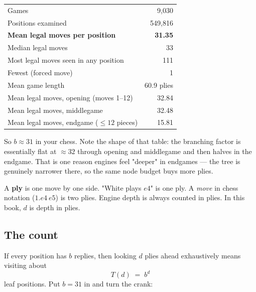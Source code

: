 \begin{realdata}[title={Real data: your corpus (\texttt{tools/corpus\_stats.py})}]
\begin{center}
\begin{tabular}{@{}lr@{}}
\toprule
Games & 9{,}030 \\
Positions examined & 549{,}816 \\
\textbf{Mean legal moves per position} & \textbf{31.35} \\
Median legal moves & 33 \\
Most legal moves seen in any position & 111 \\
Fewest (forced move) & 1 \\
Mean game length & 60.9 plies \\
\midrule
Mean legal moves, opening (moves 1--12) & 32.84 \\
Mean legal moves, middlegame & 32.48 \\
Mean legal moves, endgame ($\le 12$ pieces) & 15.81 \\
\bottomrule
\end{tabular}
\end{center}
\end{realdata}

So $b \approx 31$ in your chess. Note the shape of that table: the branching factor is
essentially flat at $\approx 32$ through opening and middlegame and then halves in the
endgame. That is one reason engines feel "deeper" in endgames --- the tree is genuinely
narrower there, so the same node budget buys more plies.

\begin{notationbox}
A \textbf{ply} is one move by one side. "White plays $e4$" is one ply. A \emph{move} in
chess notation ($1.e4\ e5$) is two plies. Engine depth is always counted in plies. In this
book, $d$ is depth in plies.
\end{notationbox}

\subsection{The count}

If every position has $b$ replies, then looking $d$ plies ahead exhaustively means visiting
about
\begin{equation}
  \label{eq:treesize}
  T(d) \;=\; b^{d}
\end{equation}
leaf positions. Put $b = 31$ in and turn the crank:

